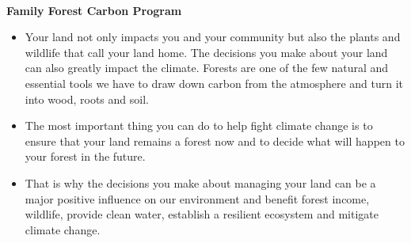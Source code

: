 \documentclass{article}\usepackage[]{graphicx}\usepackage[]{color}
\begin{document}
\vspace{3ex}\\
{\Large{\textbf{Family Forest Carbon Program}}}
  \begin{itemize}
  
  \item Your land not only impacts you and your community but also the plants and wildlife that call your land home. The decisions you make about your land can also greatly impact the climate. Forests are one of the few natural and essential tools we have to draw down carbon from the atmosphere and turn it into wood, roots and soil.
  \item  The most important thing you can do to help fight climate change is to ensure that your land remains a forest now and to decide what will happen to your forest in the future.
  \item That is why the decisions you make about managing your land can be a major positive influence on our environment and benefit forest income, wildlife, provide clean water, establish a resilient ecosystem and mitigate climate change. %
  \end{itemize}
 
\begin{centering}   
\end{centering}
\end{document}
